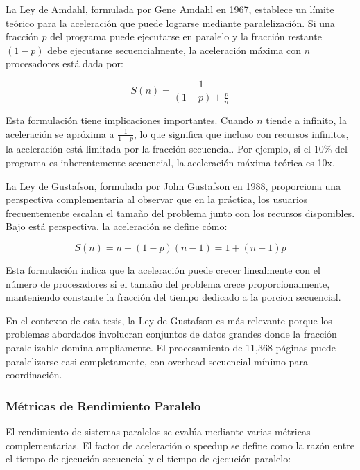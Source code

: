 \documentclass[12pt,a4paper,twoside]{book}
\begin{document}
La Ley de Amdahl, formulada por Gene Amdahl en 1967, establece un límite teórico para la aceleración que puede lograrse mediante paralelización. Si una fracción $p$ del programa puede ejecutarse en paralelo y la fracción restante $(1-p)$ debe ejecutarse secuencialmente, la aceleración máxima con $n$ procesadores está dada por:

\begin{equation}
S(n) = \frac{1}{(1-p) + \frac{p}{n}}
\label{eq:amdahl}
\end{equation}

Esta formulación tiene implicaciones importantes. Cuando $n$ tiende a infinito, la aceleración se apróxima a $\frac{1}{1-p}$, lo que significa que incluso con recursos infinitos, la aceleración está limitada por la fracción secuencial. Por ejemplo, si el 10\% del programa es inherentemente secuencial, la aceleración máxima teórica es 10x.

La Ley de Gustafson, formulada por John Gustafson en 1988, proporciona una perspectiva complementaria al observar que en la práctica, los usuarios frecuentemente escalan el tamaño del problema junto con los recursos disponibles. Bajo está perspectiva, la aceleración se define cómo:

\begin{equation}
S(n) = n - (1-p)(n-1) = 1 + (n-1)p
\label{eq:gustafson}
\end{equation}

Esta formulación indica que la aceleración puede crecer linealmente con el número de procesadores si el tamaño del problema crece proporcionalmente, manteniendo constante la fracción del tiempo dedicado a la porcion secuencial.

En el contexto de esta tesis, la Ley de Gustafson es más relevante porque los problemas abordados involucran conjuntos de datos grandes donde la fracción paralelizable domina ampliamente. El procesamiento de 11,368 páginas puede paralelizarse casi completamente, con overhead secuencial mínimo para coordinación.

\subsubsection{Métricas de Rendimiento Paralelo}

El rendimiento de sistemas paralelos se evalúa mediante varias métricas complementarias. El factor de aceleración o speedup se define como la razón entre el tiempo de ejecución secuencial y el tiempo de ejecución paralelo:
\end{document}

